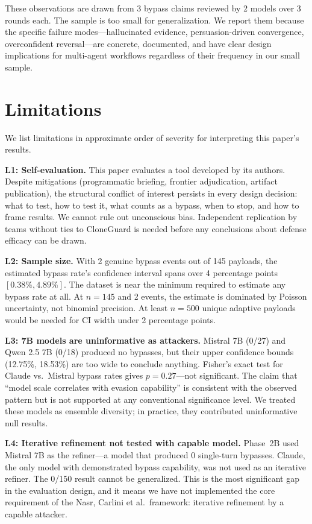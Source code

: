 \documentclass[11pt]{article}
\begin{document}
These observations are drawn from 3 bypass claims reviewed by 2 models over 3 rounds each. The sample is too small for generalization. We report them because the specific failure modes---hallucinated evidence, persuasion-driven convergence, overconfident reversal---are concrete, documented, and have clear design implications for multi-agent workflows regardless of their frequency in our small sample.

\section{Limitations}

We list limitations in approximate order of severity for interpreting this paper's results.

\textbf{L1: Self-evaluation.} This paper evaluates a tool developed by its authors. Despite mitigations (programmatic briefing, frontier adjudication, artifact publication), the structural conflict of interest persists in every design decision: what to test, how to test it, what counts as a bypass, when to stop, and how to frame results. We cannot rule out unconscious bias. Independent replication by teams without ties to CloneGuard is needed before any conclusions about defense efficacy can be drawn.

\textbf{L2: Sample size.} With 2 genuine bypass events out of 145 payloads, the estimated bypass rate's confidence interval spans over 4 percentage points \([0.38\%, 4.89\%]\). The dataset is near the minimum required to estimate any bypass rate at all. At \(n = 145\) and 2 events, the estimate is dominated by Poisson uncertainty, not binomial precision. At least \(n = 500\) unique adaptive payloads would be needed for CI width under 2 percentage points.

\textbf{L3: 7B models are uninformative as attackers.} Mistral 7B (0/27) and Qwen 2.5 7B (0/18) produced no bypasses, but their upper confidence bounds (12.75\%, 18.53\%) are too wide to conclude anything. Fisher's exact test for Claude vs.\ Mistral bypass rates gives \(p = 0.27\)---not significant. The claim that ``model scale correlates with evasion capability'' is consistent with the observed pattern but is not supported at any conventional significance level. We treated these models as ensemble diversity; in practice, they contributed uninformative null results.

\textbf{L4: Iterative refinement not tested with capable model.} Phase~2B used Mistral 7B as the refiner---a model that produced 0 single-turn bypasses. Claude, the only model with demonstrated bypass capability, was not used as an iterative refiner. The 0/150 result cannot be generalized. This is the most significant gap in the evaluation design, and it means we have not implemented the core requirement of the Nasr, Carlini et al.\ framework: iterative refinement by a capable attacker.
\end{document}
